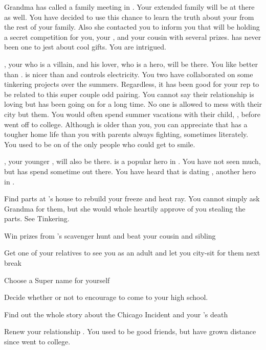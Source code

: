 \documentclass[char]{LRSguildcamp1}
\begin{document}
Grandma has called a family meeting in \pCityGrandma{}. Your extended family will be at there as well. You have decided to use this chance to learn the truth about your \cAS{\parent} from the rest of your family. Also she contacted you to inform you that \cGrandma{\they} will be holding a secret competition for you, your \cTween{\sibling}, and your cousin with several prizes. \cGrandma{} has never been one to jest about cool gifts. You are intrigued. 

\cOldest{}, your \cOldest{\uncle} who is a villain, and his lover, \cOS{} who is a hero, will be there. You like \cOS{} better than \cOldest{}. \cOS{\They} is nicer than \cOldest{} and controls electricity. You two have collaborated on some tinkering projects over the summers. Regardless, it has been good for your rep to be related to this super couple odd pairing. You cannot say their relationship is loving but has been going on for a long time. No one is allowed to mess with their city but them.  You would often spend summer vacations with their child, \cGrad{}, before \cGrad{\they} went off to college. Although \cGrad{} is older than you, you can appreciate that \cGrad{} has a tougher home life than you with parents always fighting, sometimes literately. You used to be on of the only people who could get \cGrad{} to smile.

\cYoungest{}, your younger \cYoungest{\uncle}, will also be there.  is a popular hero in \pCityYoungest{}. You have not seen \cYoungest{\them} much, but \cTween{} has spend sometime out there. You have heard that \cYoungest{} is dating \cYS{}, another hero in \pCityYoungest{}.


 
\begin{itemz}[Goals]
	\item Find parts at \cGrandma{}'s house to rebuild your freeze and heat ray. You cannot simply ask Grandma for them, but she would whole heartily approve of you stealing the parts. See Tinkering. 
	\item Win prizes from \cGrandma{}'s scavenger hunt and beat your cousin and sibling
	
		\item Get one of your relatives to see you as an adult and let you city-sit for them next break
		
		\item Choose a Super name for yourself
		
		\item Decide whether or not to encourage \cTween{} to come to your high school.
		
		\item Find out the whole story about the Chicago Incident and your \cAS{\parent}'s death
		
		\item Renew your relationship \cGrad{}. You used to be good friends, but have grown distance since \cGrad{} went to college.
		   
		
\end{itemz}
\end{document}
